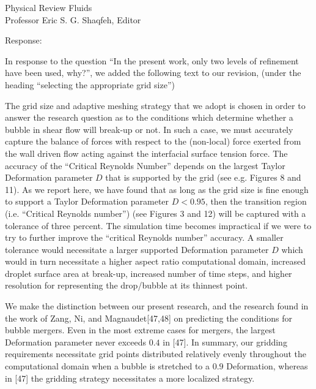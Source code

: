 \documentclass{letter}
\begin{document}
\begin{letter}{
Physical Review Fluids\\
Professor Eric S. G. Shaqfeh, Editor\\}
\begin{enumerate}
Response: \\
\par\noindent
In response to the question ``In the present
work, only two levels of refinement have been used, why?'', we added the 
following text to our revision, (under the heading ``selecting the 
appropriate grid size'')
\par\noindent

{ \color{red}
The grid size and adaptive meshing strategy that we adopt is chosen
in order to answer the research question as to the conditions which determine
whether a bubble in shear flow
will break-up or not.  In such a case, we must accurately capture the 
balance of forces with respect to the (non-local) force exerted from the 
wall driven 
flow acting against the interfacial
surface tension force.   
The accuracy of the ``Critical Reynolds Number''
depends on the 
largest Taylor Deformation parameter $D$
that is supported by the grid (see e.g. Figures 8 and 11).  
As we report here, we have found that as
long as the grid size is fine enough to support a Taylor Deformation parameter
$D<0.95$, then the transition region 
(i.e. ``Critical Reynolds number'')
(see Figures 3 and 12) will be captured
with a tolerance of three percent.  The simulation time becomes impractical
if we were to try to further improve the ``critical Reynolds number''
accuracy.  
A smaller tolerance
would necessitate a larger supported Deformation
parameter $D$ which would in turn necessitate a higher aspect ratio
computational domain, increased droplet surface area at break-up,
increased number of time steps, and higher resolution for representing the
drop/bubble at its thinnest point.

We make the distinction between our present research, and the research found
in the work of Zang, Ni, 
and Magnaudet[47,48] on predicting the
conditions for bubble mergers.  Even in the most extreme cases for
mergers, the largest Deformation parameter never exceeds
$0.4$ in [47].  In summary, our gridding requirements 
necessitate grid points distributed relatively evenly throughout the 
computational domain when a bubble is stretched to a $0.9$ Deformation,
whereas in [47] the gridding strategy necessitates 
a more localized strategy.

}


\end{enumerate}
\end{letter}
\end{document}
